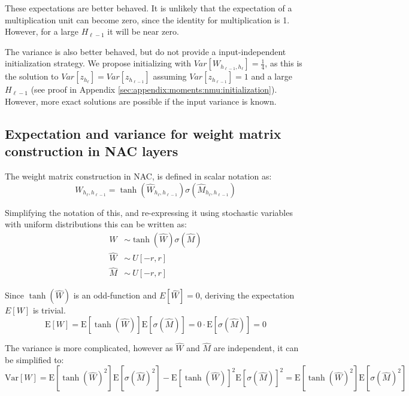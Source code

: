 These expectations are better behaved. It is unlikely that the expectation of a multiplication unit can become zero, since the identity for multiplication is 1. However, for a large $H_{\ell-1}$ it will be near zero.

The variance is also better behaved, but do not provide a input-independent initialization strategy. We propose initializing with $Var[W_{h_{\ell-1},h_\ell}] = \frac{1}{4}$, as this is the solution to $Var[z_{h_\ell}] = Var[z_{h_{\ell-1}}]$ assuming $Var[z_{h_{\ell-1}}] = 1$ and a large $H_{\ell-1}$ (see proof in Appendix \ref{sec:appendix:moments:nmu:initialization}). However, more exact solutions are possible if the input variance is known.

\subsection{Expectation and variance for weight matrix construction in NAC layers}
\label{sec:appendix:moments:weight-matrix-construction}

The weight matrix construction in NAC, is defined in scalar notation as: 
\begin{equation}
W_{h_\ell, h_{\ell-1}} = \tanh(\hat{W}_{h_\ell, h_{\ell-1}}) \sigma(\hat{M}_{h_\ell, h_{\ell-1}})
\end{equation}

Simplifying the notation of this, and re-expressing it using stochastic variables with uniform distributions this can be written as:
\begin{equation}
\begin{aligned}
W &\sim \tanh(\hat{W}) \sigma(\hat{M}) \\
\hat{W} &\sim ~ U[-r, r] \\
\hat{M} &\sim ~ U[-r, r] 
\end{aligned}
\end{equation}

Since $\tanh({\hat{W}})$ is an odd-function and $E[\hat{W}] = 0$, deriving the expectation $E[W]$ is trivial.
\begin{equation}
\mathrm{E}[W] = \mathrm{E}[\tanh(\hat{W})]\mathrm{E}[\sigma(\hat{M})] = 0 \cdot \mathrm{E}[\sigma(\hat{M})] = 0
\end{equation}

The variance is more complicated, however as $\hat{W}$ and $\hat{M}$ are independent, it can be simplified to:
\begin{equation}
\mathrm{Var}[W] = \mathrm{E}[\tanh(\hat{W})^2] \mathrm{E}[\sigma(\hat{M})^2] - \mathrm{E}[\tanh(\hat{W})]^2 \mathrm{E}[\sigma(\hat{M})]^2 = \mathrm{E}[\tanh(\hat{W})^2] \mathrm{E}[\sigma(\hat{M})^2]
\end{equation}

